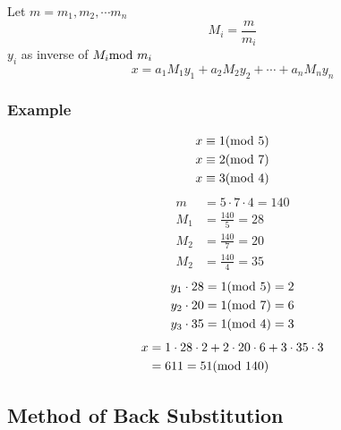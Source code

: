 \documentclass{article}
\begin{document}
Let $ m = m_1, m_2, \cdots m_n $
\begin{equation}
	M_i = \frac{ m }{ m_i }
\end{equation}
$ y_i $ as inverse of $ M_i \text{mod } m_i $
\begin{equation}
	x = a_1M_1y_1 + a_2M_2y_2 + \cdots + a_nM_ny_n
\end{equation}

\subsubsection{Example}

\begin{alignat*}{1}
	x & \equiv 1 ( \text{mod } 5 ) \\
	x & \equiv 2 ( \text{mod } 7 ) \\
	x & \equiv 3 ( \text{mod } 4 )
\end{alignat*}
\begin{align*}
	m   & = 5 \cdot 7 \cdot 4 = 140 \\
	M_1 & = \frac{ 140 }{ 5 } = 28  \\
	M_2 & = \frac{ 140 }{ 7 } = 20  \\
	M_2 & = \frac{ 140 }{ 4 } = 35
\end{align*}
\begin{align*}
	y_1 \cdot 28 & = 1(\text{mod } 5) = 2 \\
	y_2 \cdot 20 & = 1(\text{mod } 7) = 6 \\
	y_3 \cdot 35 & = 1(\text{mod } 4) = 3
\end{align*}
\begin{align*}
	x & = 1 \cdot 28 \cdot 2 + 2 \cdot 20 \cdot 6 + 3 \cdot 35 \cdot 3 \\
	  & = 611 = 51(\text{mod } 140)
\end{align*}

\subsection{Method of Back Substitution}
\end{document}
